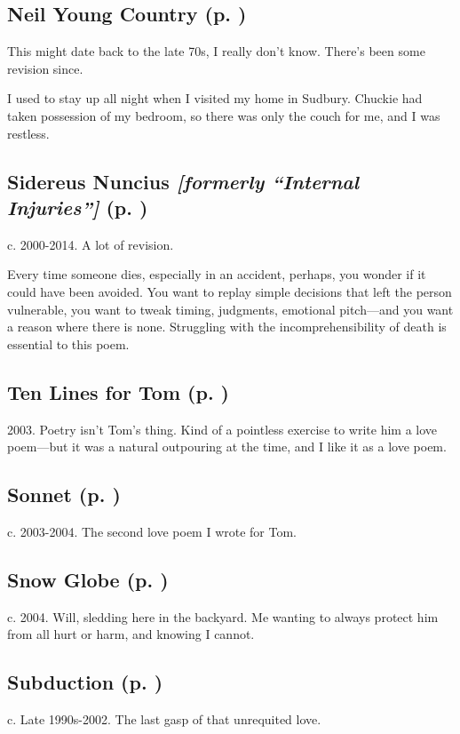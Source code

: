 \subsection*{Neil Young Country (p. \pageref{ch:neil_young_country})}
This might date back to the late 70s, I really don't know. There's been
some revision since.

I used to stay up all night when I
visited my home in Sudbury. Chuckie had taken possession of my bedroom,
so there was only the couch for me, and I was
restless.

\subsection*{Sidereus Nuncius \textit{[formerly ``Internal Injuries'']} (p. \pageref{ch:siderius_nuncius})}
c. 2000-2014. A lot of revision.

Every time someone dies, especially in an accident, perhaps, you wonder if it could have
been avoided. You want to replay simple decisions that left the person
vulnerable, you want to tweak timing, judgments, emotional pitch---and
you want a reason where there is none. Struggling with the
incomprehensibility of death is essential to this poem.

\subsection*{Ten Lines for Tom (p. \pageref{ch:ten_lines})}
2003. Poetry isn't Tom's thing. Kind of a pointless
exercise to write him a love poem---but it was a natural outpouring at
the time, and I like it as a love poem.

\subsection*{Sonnet (p. \pageref{ch:sonnet})}
c. 2003-2004. The second love poem I
wrote for Tom.

\subsection*{Snow Globe (p. \pageref{ch:snow_globe})}
c. 2004. Will, sledding here in the backyard. Me wanting
to always protect him from all hurt or harm, and knowing I
cannot.

\subsection*{Subduction (p. \pageref{ch:subduction})}
c. Late 1990s-2002. The last gasp of that unrequited
love.

